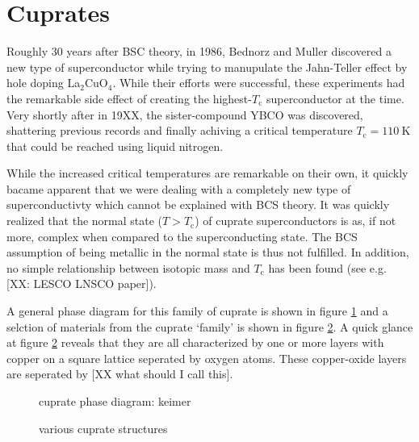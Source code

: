 \section{Cuprates}
Roughly 30 years after BSC theory, in 1986, Bednorz and Muller discovered a new type of superconductor while trying to manupulate the Jahn-Teller effect by hole doping La$_2$CuO$_4$. While their efforts were successful, these experiments had the remarkable side effect of creating the highest-$T_\text{c}$ superconductor at the time. Very shortly after in 19XX, the sister-compound YBCO was discovered, shattering previous records and finally achiving a critical temperature $T_\text{c} = \SI{110}{\kelvin}$ that could be reached using liquid nitrogen. 

While the increased critical temperatures are remarkable on their own, it quickly bacame apparent that we were dealing with a completely new type of superconductivty which cannot be explained with BCS theory. It was quickly realized that the normal state ($T > T_\text{c}$) of cuprate superconductors is as, if not more, complex when compared to the superconducting state. The BCS assumption of being metallic in the normal state is thus not fulfilled. In addition, no simple relationship between isotopic mass and $T_\text{c}$ has been found (see e.g. [XX: LESCO LNSCO paper]).

A general phase diagram for this family of cuprate is shown in figure \ref{fig:cuprate_phase_keimer} and a selction of materials from the cuprate `family' is shown in figure \ref{fig:cuprate_family_structures}. A quick glance at figure \ref{fig:cuprate_family_structures} reveals that they are all characterized by one or more layers with copper on a square lattice seperated by oxygen atoms. These copper-oxide layers are seperated by [XX what should I call this]. 

\begin{figure}
    \centering
    \caption[cuprate phase diagram: keimer]{cuprate phase diagram: keimer}
    \label{fig:cuprate_phase_keimer}
\end{figure}

\begin{figure}
    \centering
    \caption[various cuprate structures]{various cuprate structures}
    \label{fig:cuprate_family_structures}
\end{figure}


